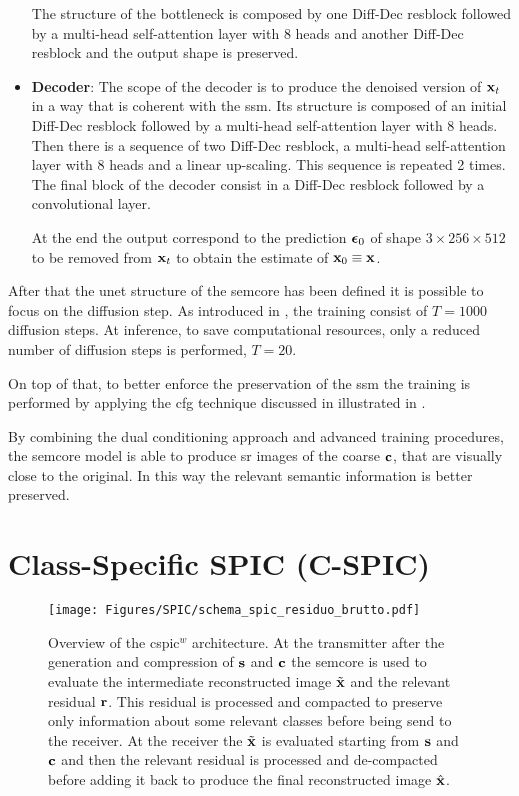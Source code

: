 \begin{itemize}[label={}]
    The structure of the bottleneck is composed by one Diff-Dec \gls{resblock} followed by a multi-head self-attention layer with 8 heads and another Diff-Dec \gls{resblock} and the output shape is preserved.
    \item {\textbf{Decoder}:} The scope of the decoder is to produce the denoised version of $\mathbf{x}_t$ in a way that is coherent with the \gls{ssm}. Its structure is composed of an initial Diff-Dec \gls{resblock} followed by a multi-head self-attention layer with 8 heads. Then there is a sequence of two Diff-Dec \gls{resblock}, a multi-head self-attention layer with 8 heads and a linear up-scaling. This sequence is repeated 2 times. The final block of the decoder consist in a  Diff-Dec \gls{resblock} followed by a convolutional layer. 
    
    At the end the output correspond to the prediction $\boldsymbol{\epsilon}_0$ of shape $3 \times 256 \times 512$ to be removed from $\mathbf{x}_t$ to obtain the estimate of $\mathbf{x}_0\equiv \mathbf{x}$.
\end{itemize}

After that the \gls{unet} structure of the \gls{semcore} has been defined it is possible to focus on the diffusion step. 
As introduced in , the training consist of $T=1000$ diffusion steps. At inference, to save computational resources, only a reduced number of diffusion steps is performed, $T=20$.

On top of that, to better enforce the preservation of the \gls{ssm} the training is performed by applying the \gls{cfg} technique discussed in  illustrated in .

By combining the dual conditioning approach and advanced training procedures, the \gls{semcore} model is able to produce \gls{sr} images of the coarse $\mathbf{c}$, that are visually close to the original. In this way the relevant semantic information is better preserved.


\section{Class-Specific SPIC (C-SPIC)}\label{sec: SPIC residuo}

\begin{figure}[!t]
    \centering
    \texttt{[image: Figures/SPIC/schema\_spic\_residuo\_brutto.pdf]}
    \caption[\acrshort{cspic}$^w$ architecture scheme]{Overview of the \acrshort{cspic}$^w$ architecture. At the transmitter after the generation and compression of $\mathbf{s}$ and  $\mathbf{c}$ the \acrshort{semcore} is used to evaluate the intermediate reconstructed image $\tilde{\mathbf{x}}$ and the relevant residual $\mathbf{r}$. This residual is processed and compacted to preserve only information about some relevant classes before being send to the receiver. At the receiver the $\tilde{\mathbf{x}}$ is evaluated starting from $\mathbf{s}$ and $\mathbf{c}$ and then the relevant residual is processed and de-compacted before adding it back to produce the final reconstructed image $\hat{\mathbf{x}}$.}
    \label{fig: SPIC cspic with residual scheme}
\end{figure}

